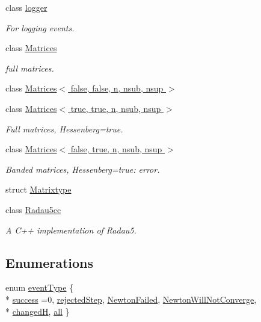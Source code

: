 \begin{DoxyCompactItemize}
class \hyperlink{classodes_1_1logger}{logger}
\begin{DoxyCompactList}\small\item\em For logging events. \end{DoxyCompactList}\item 
class \hyperlink{classodes_1_1Matrices}{Matrices}
\begin{DoxyCompactList}\small\item\em full matrices. \end{DoxyCompactList}\item 
class \hyperlink{classodes_1_1Matrices_3_01false_00_01false_00_01n_00_01nsub_00_01nsup_01_4}{Matrices$<$ false, false, n, nsub, nsup $>$}
\item 
class \hyperlink{classodes_1_1Matrices_3_01true_00_01true_00_01n_00_01nsub_00_01nsup_01_4}{Matrices$<$ true, true, n, nsub, nsup $>$}
\begin{DoxyCompactList}\small\item\em Full matrices, Hessenberg=true. \end{DoxyCompactList}\item 
class \hyperlink{classodes_1_1Matrices_3_01false_00_01true_00_01n_00_01nsub_00_01nsup_01_4}{Matrices$<$ false, true, n, nsub, nsup $>$}
\begin{DoxyCompactList}\small\item\em Banded matrices, Hessenberg=true\-: error. \end{DoxyCompactList}\item 
struct \hyperlink{structodes_1_1Matrixtype}{Matrixtype}
\item 
class \hyperlink{classodes_1_1Radau5cc}{Radau5cc}
\begin{DoxyCompactList}\small\item\em A C++ implementation of Radau5. \end{DoxyCompactList}\end{DoxyCompactItemize}
\subsection*{Enumerations}
\begin{DoxyCompactItemize}
\item 
enum \hyperlink{namespaceodes_a0e9924dcd4d2b0cedc36ec2eff4dcba8}{event\-Type} \{ \\*
\hyperlink{namespaceodes_a0e9924dcd4d2b0cedc36ec2eff4dcba8ad4b896da4797189f441c09833809cd9b}{success} =0, 
\hyperlink{namespaceodes_a0e9924dcd4d2b0cedc36ec2eff4dcba8a63543747bb83162c25560885509e7ee2}{rejected\-Step}, 
\hyperlink{namespaceodes_a0e9924dcd4d2b0cedc36ec2eff4dcba8ab34441382e71cf7d70c345be11743cee}{Newton\-Failed}, 
\hyperlink{namespaceodes_a0e9924dcd4d2b0cedc36ec2eff4dcba8aa3c3a7a051ec8570634a29155a6b62e0}{Newton\-Will\-Not\-Converge}, 
\\*
\hyperlink{namespaceodes_a0e9924dcd4d2b0cedc36ec2eff4dcba8a00d366881a9a224a0e426eb018f1db23}{changed\-H}, 
\hyperlink{namespaceodes_a0e9924dcd4d2b0cedc36ec2eff4dcba8ad985883a2a443d3b103d6b312caefef2}{all}
 \}
\end{DoxyCompactItemize}
